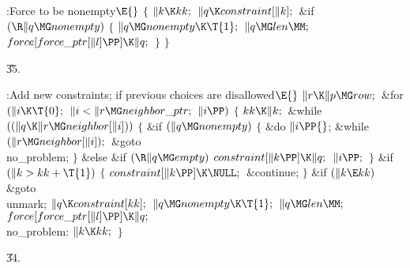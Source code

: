 \B{}:Force  to be nonempty\X${}\E{}$\6
${}\{{}$\1\6
${}\|k\K\\{kk};{}$\6
${}\|q\K\\{constraint}[\|k];{}$\6
\&{if} ${}(\R\|q\MG\\{nonempty}){}$\5
${}\{{}$\1\6
${}\|q\MG\\{nonempty}\K\T{1};{}$\6
${}\|q\MG\\{len}\MM;{}$\6
${}\\{force}[\\{force\_ptr}[\|l]\PP]\K\|q;{}$\6
\4${}\}{}$\2\6
\4${}\}{}$\2\par
\U35.\fi

\B{}:Add new constraints;  if previous choices
are disallowed\X${}\E{}$\6
$\|r\K\|p\MG\\{row};{}$\6
\&{for} ${}(\|i\K\T{0};{}$ ${}\|i<\|r\MG\\{neighbor\_ptr};{}$ ${}\|i\PP){}$\5
${}\{{}$\1\6
${}\\{kk}\K\|k;{}$\6
\&{while} ${}((\|q\K\|r\MG\\{neighbor}[\|i])){}$\5
${}\{{}$\1\6
\&{if} ${}(\|q\MG\\{nonempty}){}$\5
${}\{{}$\1\6
\&{do}\5
${}\|i\PP{}$;\5
\5
\&{while} ${}(\|r\MG\\{neighbor}[\|i]);{}$\6
\&{goto} \\{no\_problem};\6
\4${}\}{}$\2\6
\&{else} \&{if} ${}(\R\|q\MG\\{empty}){}$\1\5
${}\\{constraint}[\|k\PP]\K\|q;{}$\2\6
${}\|i\PP;{}$\6
\4${}\}{}$\2\6
\&{if} ${}(\|k>\\{kk}+\T{1}){}$\5
${}\{{}$\1\6
${}\\{constraint}[\|k\PP]\K\NULL;{}$\6
\&{continue};\6
\4${}\}{}$\2\6
\&{if} ${}(\|k\E\\{kk}){}$\1\5
\&{goto} \\{unmark};\2\6
${}\|q\K\\{constraint}[\\{kk}];{}$\6
${}\|q\MG\\{nonempty}\K\T{1};{}$\6
${}\|q\MG\\{len}\MM;{}$\6
${}\\{force}[\\{force\_ptr}[\|l]\PP]\K\|q;{}$\6
\4\\{no\_problem}:\5
${}\|k\K\\{kk};{}$\6
\4${}\}{}$\2\par
\U34.\fi

